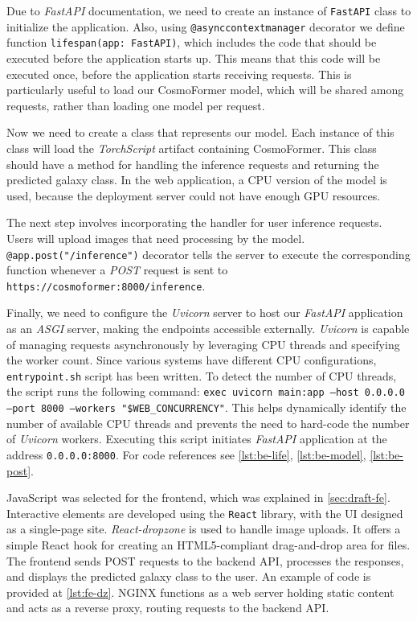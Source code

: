 Due to \textit{FastAPI} documentation, we need to create an instance of \texttt{FastAPI} class to initialize the application. Also, using \texttt{@asynccontextmanager} decorator we define function \texttt{lifespan(app: FastAPI)}, which includes the code that should be executed before the application starts up. This means that this code will be executed once, before the application starts receiving requests. This is particularly useful to load our CosmoFormer model, which will be shared among requests, rather than loading one model per request.

Now we need to create a class that represents our model. Each instance of this class will load the \textit{TorchScript} artifact containing CosmoFormer. This class should have a method for handling the inference requests and returning the predicted galaxy class. In the web application, a CPU version of the model is used, because the deployment server could not have enough GPU resources. 

The next step involves incorporating the handler for user inference requests. Users will upload images that need processing by the model. \texttt{@app.post("/inference")} decorator tells the server to execute the corresponding function whenever a \textit{POST} request is sent to \texttt{https://cosmoformer:8000/inference}. 

Finally, we need to configure the \textit{Uvicorn} server to host our \textit{FastAPI} application as an \textit{ASGI} server, making the endpoints accessible externally. \textit{Uvicorn} is capable of managing requests asynchronously by leveraging CPU threads and specifying the worker count. Since various systems have different CPU configurations, \texttt{entrypoint.sh} script has been written. To detect the number of CPU threads, the script runs the following command: \texttt{exec uvicorn main:app --host 0.0.0.0 --port 8000 --workers "\$WEB\_CONCURRENCY"}. This helps dynamically identify the number of available CPU threads and prevents the need to hard-code the number of \textit{Uvicorn} workers. Executing this script initiates \textit{FastAPI} application at the address \texttt{0.0.0.0:8000}. For code references see \autoref{lst:be-life}, \autoref{lst:be-model}, \autoref{lst:be-post}.

JavaScript was selected for the frontend, which was explained in \autoref{sec:draft-fe}. Interactive elements are developed using the \texttt{React} library, with the UI designed as a single-page site. \textit{React-dropzone} is used to handle image uploads. It offers a simple React hook for creating an HTML5-compliant drag-and-drop area for files. The frontend sends POST requests to the backend API, processes the responses, and displays the predicted galaxy class to the user. An example of code is provided at \autoref{lst:fe-dz}. NGINX functions as a web server holding static content and acts as a reverse proxy, routing requests to the backend API.

